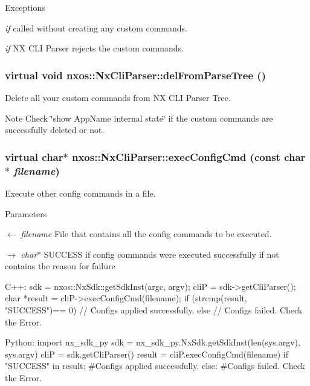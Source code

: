 \begin{DoxyExceptions}{Exceptions}
\item[{\em if}]called without creating any custom commands. \item[{\em if}]NX CLI Parser rejects the custom commands. \end{DoxyExceptions}
\hypertarget{classnxos_1_1NxCliParser_a169976099ecf7a05277bfc72259ff1bc}{
\subsubsection[{delFromParseTree}]{\setlength{\rightskip}{0pt plus 5cm}virtual void nxos::NxCliParser::delFromParseTree ()}}
\label{classnxos_1_1NxCliParser_a169976099ecf7a05277bfc72259ff1bc}
Delete all your custom commands from NX CLI Parser Tree. \begin{DoxyNote}{Note}
Check \char`\"{}show AppName internal state\char`\"{} if the custom commands are successfully deleted or not. 
\end{DoxyNote}
\hypertarget{classnxos_1_1NxCliParser_aa22ee0395ceadc46a3e28b93c5a5b75e}{
\subsubsection[{execConfigCmd}]{\setlength{\rightskip}{0pt plus 5cm}virtual char$\ast$ nxos::NxCliParser::execConfigCmd (const char $\ast$ {\em filename})}}
\label{classnxos_1_1NxCliParser_aa22ee0395ceadc46a3e28b93c5a5b75e}
Execute other config commands in a file. 
\begin{DoxyParams}{Parameters}
\item[\mbox{$\leftarrow$} {\em filename}]File that contains all the config commands to be executed. \item[\mbox{$\rightarrow$} {\em char$\ast$}]SUCCESS if config commands were executed successfully if not contains the reason for failure 
\begin{DoxyCode}
  C++:
       sdk = nxos::NxSdk::getSdkInst(argc, argv);
       cliP = sdk->getCliParser();
       char *result = cliP->execConfigCmd(filename);
       if (strcmp(result, "SUCCESS")== 0) {
           // Configs applied successfully.
       } else {
           // Configs failed. Check the Error.
       }

  Python:
       import nx_sdk_py
       sdk = nx_sdk_py.NxSdk.getSdkInst(len(sys.argv), sys.argv)
       cliP = sdk.getCliParser()
       result = cliP.execConfigCmd(filename)
       if "SUCCESS" in result:
           #Configs applied successfully.
       else:
           #Configs failed. Check the Error.
\end{DoxyCode}
 \end{DoxyParams}
